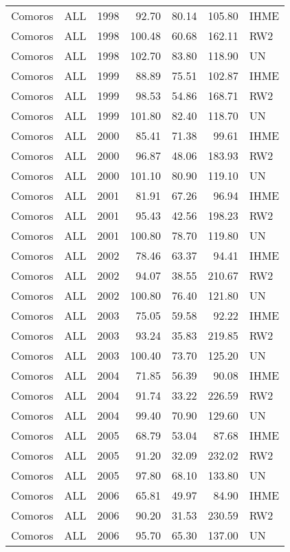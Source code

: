 \begin{longtable}{lllrrrl}
  Comoros & ALL & 1998 & 92.70 & 80.14 & 105.80 & IHME \\ 
  Comoros & ALL & 1998 & 100.48 & 60.68 & 162.11 & RW2 \\ 
  Comoros & ALL & 1998 & 102.70 & 83.80 & 118.90 & UN \\ 
  Comoros & ALL & 1999 & 88.89 & 75.51 & 102.87 & IHME \\ 
  Comoros & ALL & 1999 & 98.53 & 54.86 & 168.71 & RW2 \\ 
  Comoros & ALL & 1999 & 101.80 & 82.40 & 118.70 & UN \\ 
  Comoros & ALL & 2000 & 85.41 & 71.38 & 99.61 & IHME \\ 
  Comoros & ALL & 2000 & 96.87 & 48.06 & 183.93 & RW2 \\ 
  Comoros & ALL & 2000 & 101.10 & 80.90 & 119.10 & UN \\ 
  Comoros & ALL & 2001 & 81.91 & 67.26 & 96.94 & IHME \\ 
  Comoros & ALL & 2001 & 95.43 & 42.56 & 198.23 & RW2 \\ 
  Comoros & ALL & 2001 & 100.80 & 78.70 & 119.80 & UN \\ 
  Comoros & ALL & 2002 & 78.46 & 63.37 & 94.41 & IHME \\ 
  Comoros & ALL & 2002 & 94.07 & 38.55 & 210.67 & RW2 \\ 
  Comoros & ALL & 2002 & 100.80 & 76.40 & 121.80 & UN \\ 
  Comoros & ALL & 2003 & 75.05 & 59.58 & 92.22 & IHME \\ 
  Comoros & ALL & 2003 & 93.24 & 35.83 & 219.85 & RW2 \\ 
  Comoros & ALL & 2003 & 100.40 & 73.70 & 125.20 & UN \\ 
  Comoros & ALL & 2004 & 71.85 & 56.39 & 90.08 & IHME \\ 
  Comoros & ALL & 2004 & 91.74 & 33.22 & 226.59 & RW2 \\ 
  Comoros & ALL & 2004 & 99.40 & 70.90 & 129.60 & UN \\ 
  Comoros & ALL & 2005 & 68.79 & 53.04 & 87.68 & IHME \\ 
  Comoros & ALL & 2005 & 91.20 & 32.09 & 232.02 & RW2 \\ 
  Comoros & ALL & 2005 & 97.80 & 68.10 & 133.80 & UN \\ 
  Comoros & ALL & 2006 & 65.81 & 49.97 & 84.90 & IHME \\ 
  Comoros & ALL & 2006 & 90.20 & 31.53 & 230.59 & RW2 \\ 
  Comoros & ALL & 2006 & 95.70 & 65.30 & 137.00 & UN \\ 

\end{longtable}
